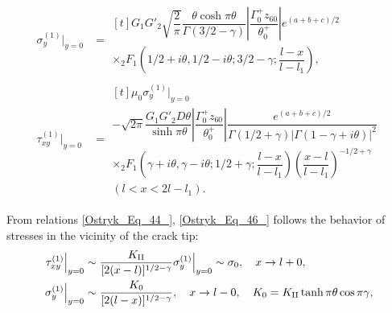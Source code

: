 \begin{equation} \label{Ostryk_Eq_46_} 
\begin{aligned}
	\sigma _{y}^{(1)} \Big|_{y=0} &=
	\begin{multlined}[t]
		G_{1} G'_{2} \sqrt{\dfrac{2}{\pi } } \dfrac{\theta \cosh \pi \theta }{\Gamma (3/2 -\gamma )} \left|\dfrac{\Gamma _{0}^{+} z_{60} }{\theta _{0}^{+} } \right|e^{(a+b+c)/2}  
		\\
		\times {}_{2} F_{1} \left(1/2 +i\theta , 1/2 -i\theta ; 3/2 -\gamma ; \dfrac{l-x}{l-l_{1} } \right),
	\end{multlined}
	\\
	\tau _{xy}^{(1)} \Big|_{y=0} &=
	\begin{multlined}[t]
		\mu _{0}  \sigma _{y}^{(1)} \Big|_{y=0}
		\\
		-\sqrt{2\pi } \dfrac{G_{1} G'_{2} D\theta }{\sinh \pi \theta } \left|\dfrac{\Gamma _{0}^{+} z_{60} }{\theta _{0}^{+} } \right|\dfrac{e^{(a+b+c)/2}} {\Gamma (1/2 +\gamma )\left|\Gamma (1-\gamma +i\theta )\right|^{2} } 
		\\
		\times {}_{2} F_{1} \left(\gamma +i\theta , \gamma -i\theta ; 1/2 +\gamma; \dfrac{l-x}{l-l_{1} } \right)\left(\dfrac{x-l}{l-l_{1} } \right)^{-1/2 +\gamma } 
		\\
		(l<x<2l-l_{1} ). 
	\end{multlined}
\end{aligned}
\end{equation} 

From relations \eqref{Ostryk_Eq_44_}, \eqref{Ostryk_Eq_46_} follows the behavior of stresses in the vicinity of the crack tip:
\begin{equation} \label{Ostryk_Eq_47_} 
\begin{aligned}
	\tau _{xy}^{(1)} \Big|_{y=0} &\sim \dfrac{K_{{\rm II}} }{[2(x-l)]^{1/2 -\gamma } } \sigma _{y}^{(1)} \Big|_{y=0} \sim \sigma _{0} ,\quad  x\to l+0,
	\\
	\sigma _{y}^{(1)} \Big|_{y=0} &\sim {\dfrac{K_{0} }{[2(l-x)]^{1/2 -\gamma } }} , \quad x\to l-0, \quad   K_{0} =K_{{\rm II}} \tanh\pi \theta \cos \pi \gamma ,
\end{aligned}
\end{equation}  

